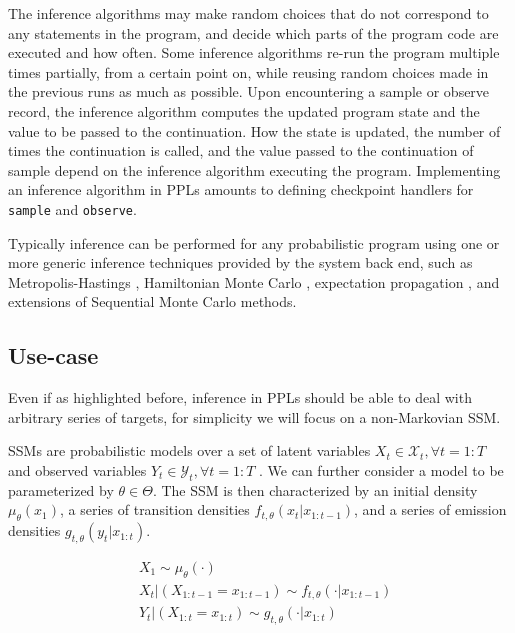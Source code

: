 The inference algorithms may make random choices that do not correspond to any statements in the program, and decide which parts of the program code are executed and how often. Some inference algorithms re-run the program multiple times partially, from a certain point on, while reusing random choices made in the previous runs as much as possible.
Upon encountering a sample or observe record, the inference algorithm computes the updated program state and the value to be passed to the continuation. How the state is updated, the number of times the continuation is called, and the value passed to the continuation of sample depend on the inference algorithm executing the program.
Implementing an inference algorithm in \glspl{PPL} amounts to defining 
checkpoint handlers for \texttt{sample} and \texttt{observe}.

Typically inference can be performed for any probabilistic program using one or more generic inference techniques provided by the system back end, such as Metropolis-Hastings \cite{Wingate:2011ul, Mansinghka:2014ty}, Hamiltonian Monte Carlo \cite{Stan}, expectation propagation \cite{InferNET}, and extensions of Sequential Monte Carlo \cite{vandeMeent:2015uk, Paige:2014tc, Wood:2015tr} methods.

\subsection{Use-case}
Even if as highlighted before, inference in \glspl{PPL} should be able to deal with arbitrary series of targets, for simplicity we will focus on a non-Markovian \gls{SSM}.

\Gls{SSM}s are probabilistic models over a set of latent variables $X_t \in \mathcal{X}_t, \forall t = 1 : T$ and observed variables $Y_t \in \mathcal{Y}_t , \forall t = 1 : T$ . We can further consider a model to be parameterized by $\theta \in \Theta$. The \gls{SSM} is then characterized by an initial density $\mu_\theta(x_1)$, a series of transition densities $f_{t,\theta}(x_t|x_{1:t-1})$, and a series of emission densities $g_{t,\theta}(y_t|x_{1:t})$.

\begin{equation*}
\begin{aligned}
& X_1 \sim \mu_\theta(\cdot) \\
& X_t|(X_{1:t-1} = x_{1:t-1}) \sim f_{t,\theta}(\cdot|x_{1:t-1}) \\
& Y_t|(X_{1:t} = x_{1:t}) \sim g_{t,\theta}(\cdot|x_{1:t}) \\
\end{aligned}
\end{equation*}

